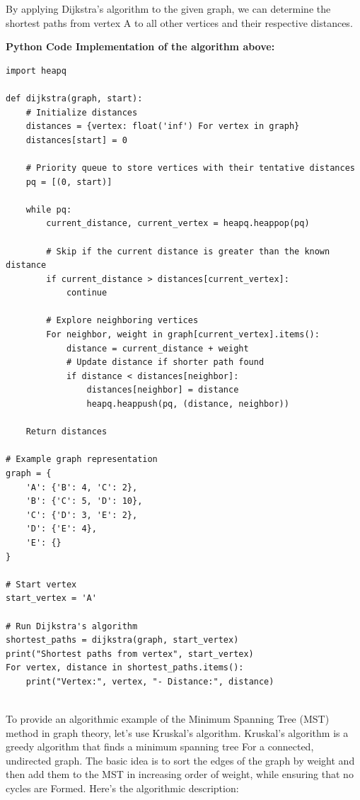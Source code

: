 \documentclass[12pt]{book} %
\begin{document}
By applying Dijkstra's algorithm to the given graph, we can determine the shortest paths from vertex A to all other vertices and their respective distances.

\FloatBarrier
\textbf{Python Code Implementation of the algorithm above:}
\FloatBarrier
\begin{lstlisting}
import heapq

def dijkstra(graph, start):
    # Initialize distances
    distances = {vertex: float('inf') For vertex in graph}
    distances[start] = 0
    
    # Priority queue to store vertices with their tentative distances
    pq = [(0, start)]
    
    while pq:
        current_distance, current_vertex = heapq.heappop(pq)
        
        # Skip if the current distance is greater than the known distance
        if current_distance > distances[current_vertex]:
            continue
        
        # Explore neighboring vertices
        For neighbor, weight in graph[current_vertex].items():
            distance = current_distance + weight
            # Update distance if shorter path found
            if distance < distances[neighbor]:
                distances[neighbor] = distance
                heapq.heappush(pq, (distance, neighbor))
    
    Return distances

# Example graph representation
graph = {
    'A': {'B': 4, 'C': 2},
    'B': {'C': 5, 'D': 10},
    'C': {'D': 3, 'E': 2},
    'D': {'E': 4},
    'E': {}
}

# Start vertex
start_vertex = 'A'

# Run Dijkstra's algorithm
shortest_paths = dijkstra(graph, start_vertex)
print("Shortest paths from vertex", start_vertex)
For vertex, distance in shortest_paths.items():
    print("Vertex:", vertex, "- Distance:", distance)
    
\end{lstlisting}
\FloatBarrier

To provide an algorithmic example of the Minimum Spanning Tree (MST) method in graph theory, let's use Kruskal's algorithm. Kruskal's algorithm is a greedy algorithm that finds a minimum spanning tree For a connected, undirected graph. The basic idea is to sort the edges of the graph by weight and then add them to the MST in increasing order of weight, while ensuring that no cycles are Formed. Here's the algorithmic description:
\end{document}
